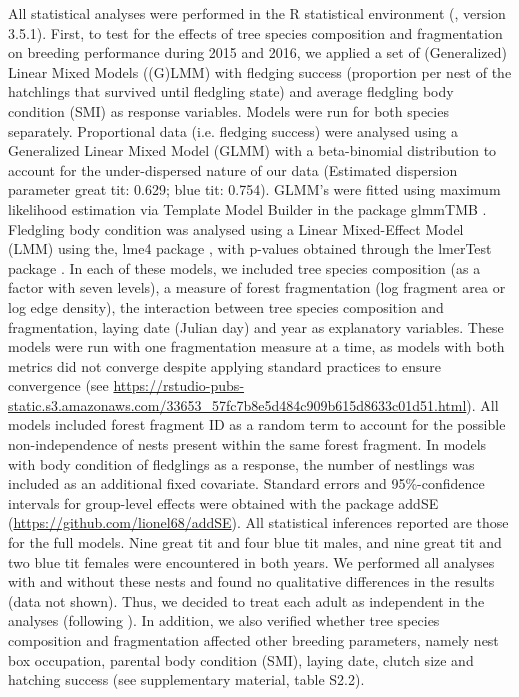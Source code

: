 \documentclass[10pt, twoside]{book} %
\begin{document}
		All statistical analyses were performed in the R statistical environment (\citealt{RCoreTeam2018}, version 3.5.1). First, to test for the effects of tree species composition and fragmentation on breeding performance during 2015 and 2016, we applied a set of (Generalized) Linear Mixed Models ((G)LMM) with fledging success (proportion per nest of the hatchlings that survived until fledgling state) and average fledgling body condition (SMI) as response variables. Models were run for both species separately. Proportional data (i.e. fledging success) were analysed using a Generalized Linear Mixed Model (GLMM) with a beta-binomial distribution to account for the under-dispersed nature of our data (Estimated dispersion parameter great tit: 0.629; blue tit: 0.754). GLMM's were fitted using maximum likelihood estimation via Template Model Builder in the package glmmTMB \citep{Brooks2017}. Fledgling body condition was analysed using a Linear Mixed-Effect Model (LMM) using the, lme4 package \citep{Bates2015}, with p-values obtained through the lmerTest package \citep{Kuznetsova2017}. In each of these models, we included tree species composition (as a factor with seven levels), a measure of forest fragmentation (log fragment area or log edge density), the interaction between tree species composition and fragmentation, laying date (Julian day) and year as explanatory variables. These models were run with one fragmentation measure at a time, as models with both metrics did not converge despite applying standard practices to ensure convergence (see \url{https://rstudio-pubs-static.s3.amazonaws.com/33653_57fc7b8e5d484c909b615d8633c01d51.html}). All models included forest fragment ID as a random term to account for the possible non-independence of nests present within the same forest fragment. In models with body condition of fledglings as a response, the number of nestlings was included as an additional fixed covariate. Standard errors and 95\%-confidence intervals for group-level effects were obtained with the package addSE (\url{https://github.com/lionel68/addSE}). All statistical inferences reported are those for the full models. Nine great tit and four blue tit males, and nine great tit and two blue tit females were encountered in both years. We performed all analyses with and without these nests and found no qualitative differences in the results (data not shown). Thus, we decided to treat each adult as independent in the analyses (following \citealt{Bueno-Enciso2016}). In addition, we also verified whether tree species composition and fragmentation affected other breeding parameters, namely nest box occupation, parental body condition (SMI), laying date, clutch size and hatching success (see supplementary material, table S2.2).
		
\end{document}
